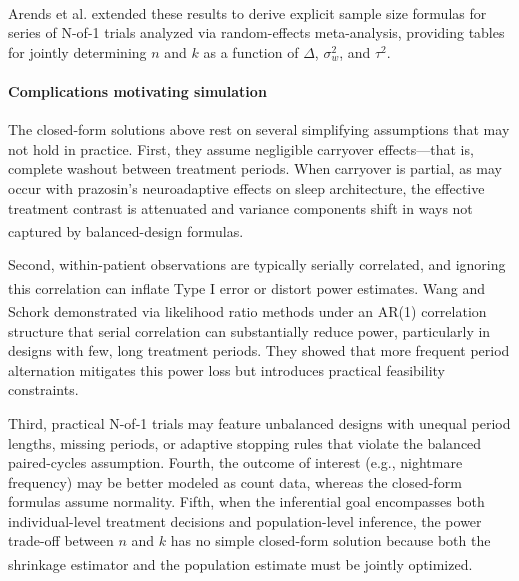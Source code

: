 \documentclass[
  11pt,
]{article}
\begin{document}
Arends et
al.\textsuperscript{}
extended these results to derive explicit sample size formulas for
series of N-of-1 trials analyzed via random-effects meta-analysis,
providing tables for jointly determining \(n\) and \(k\) as a function
of \(\Delta\), \(\sigma^2_w\), and \(\tau^2\).

\paragraph{Complications motivating
simulation}\label{complications-motivating-simulation}

The closed-form solutions above rest on several simplifying assumptions
that may not hold in practice. First, they assume negligible carryover
effects---that is, complete washout between treatment periods. When
carryover is partial, as may occur with prazosin's neuroadaptive effects
on sleep architecture, the effective treatment contrast is attenuated
and variance components shift in ways not captured by balanced-design
formulas\textsuperscript{}.

Second, within-patient observations are typically serially correlated,
and ignoring this correlation can inflate Type I error or distort power
estimates\textsuperscript{}.
Wang and
Schork\textsuperscript{}
demonstrated via likelihood ratio methods under an AR(1) correlation
structure that serial correlation can substantially reduce power,
particularly in designs with few, long treatment periods. They showed
that more frequent period alternation mitigates this power loss but
introduces practical feasibility constraints.

Third, practical N-of-1 trials may feature unbalanced designs with
unequal period lengths, missing periods, or adaptive stopping rules that
violate the balanced paired-cycles assumption. Fourth, the outcome of
interest (e.g., nightmare frequency) may be better modeled as count
data, whereas the closed-form formulas assume normality. Fifth, when the
inferential goal encompasses both individual-level treatment decisions
and population-level inference, the power trade-off between \(n\) and
\(k\) has no simple closed-form solution because both the shrinkage
estimator and the population estimate must be jointly
optimized\textsuperscript{}.
\end{document}

